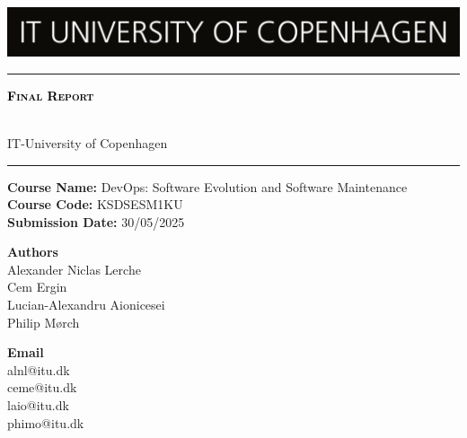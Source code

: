 \begin{titlepage}

\centering
\includegraphics[width=\textwidth]{images/FrontPage/ITU_logo_en.jpg}
	\textcolor{black}{\rule{\linewidth}{1pt}} \par
     {\scshape\Huge\bfseries \textcolor{black}{Final Report}\par} 
	\vspace{1pt} { \\ 
	IT-University of Copenhagen \par}
	\textcolor{black}{\rule{\linewidth}{1pt}} \par
	\vspace*{0.25cm}
 \textbf{Course Name:} DevOps: Software Evolution and Software Maintenance\\
\textbf{Course Code:} KSDSESM1KU\\
\textbf{Submission Date:} 30/05/2025\\
 
\vspace*{1cm}
 
\begin{minipage}{0.75\textwidth}
    \begin{flushleft}
        \textbf{Authors}\\
        Alexander Niclas Lerche\\
        Cem Ergin\\
        Lucian-Alexandru Aionicesei\\
        Philip Mørch
    \end{flushleft}
    \end{minipage}
    \begin{minipage}{0.20\textwidth}
    \begin{flushright}
        \textbf{Email}\\
        alnl@itu.dk\\
        ceme@itu.dk\\
        laio@itu.dk\\
        phimo@itu.dk
    \end{flushright}
\end{minipage}

\end{titlepage}
